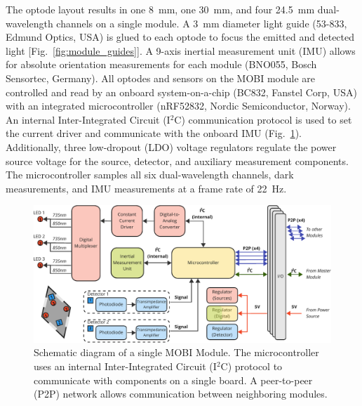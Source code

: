 The optode layout results in one 8~mm, one 30~mm, and four 24.5~mm dual-wavelength channels on a single module. A 3~mm diameter light guide (53-833, Edmund Optics, USA) is glued to each optode to focus the emitted and detected light [Fig.~\ref{fig:module_guides}]. A 9-axis inertial measurement unit (IMU) allows for absolute orientation measurements for each module (BNO055, Bosch Sensortec, Germany). All optodes and sensors on the MOBI module are controlled and read by an onboard system-on-a-chip (BC832, Fanstel Corp, USA) with an integrated microcontroller (nRF52832, Nordic Semiconductor, Norway). An internal Inter-Integrated Circuit (I$^2$C) communication protocol is used to set the current driver and communicate with the onboard IMU (Fig.~\ref{fig:architecture_mobi}). Additionally, three low-dropout (LDO) voltage regulators regulate the power source voltage for the source, detector, and auxiliary measurement components. The microcontroller samples all six dual-wavelength channels, dark measurements, and IMU measurements at a frame rate of 22~Hz. 

\begin{figure}
	\begin{center}
	    \includegraphics[width=\textwidth]{fig/mobi/architecture_mobi.pdf}
	\end{center}
	\caption{Schematic diagram of a single MOBI Module. The microcontroller uses an internal Inter-Integrated Circuit (I$^2$C) protocol to communicate with components on a single board. A peer-to-peer (P2P) network allows communication between neighboring modules. } 
	\label{fig:architecture_mobi}
\end{figure} 

